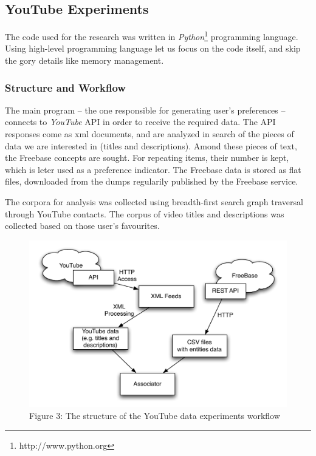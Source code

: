 \subsection{YouTube Experiments}
The code used for the research was written in \textit{Python}\footnote{http://www.python.org}
programming language. Using high-level programming language let us focus on the code itself, and skip the
gory details like memory management.

\subsubsection{Structure and Workflow}
The main program -- the one responsible for generating user's preferences
-- connects to \textit{YouTube} API in order to receive the required data. The
API responses come as xml documents, and are analyzed in search of the pieces of
data we are interested in (titles and descriptions). Amond these pieces of text,
the Freebase concepts are sought. For repeating items, their number is kept,
which is leter used as a preference indicator.  The Freebase data
is stored as flat files, downloaded from the dumps regularily published by the
Freebase service.

The corpora for analysis was collected using breadth-first search graph
traversal through YouTube contacts. The corpus of video titles and descriptions
was collected based on those user's favourites.

\begin{figure}[h!]
  \begin{center}
	  \includegraphics[scale=0.65]{images/youtube_diagram.pdf} \\
	  Figure 3: The structure of the YouTube data experiments workflow
  \end{center}
\end{figure}


